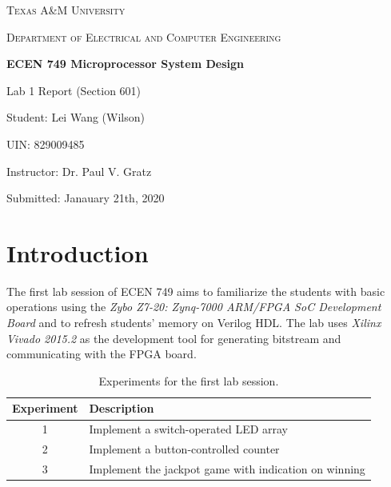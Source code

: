 \documentclass[11pt,letterpaper,titlepage]{article}
\begin{document}
\begin{titlepage}
  \centering
	{\scshape\large Texas A\&M University \par}
	\vspace{1cm}
	{\scshape\Large Department of Electrical and Computer Engineering \par}
	\vspace{4cm}
    \vspace{0.5cm}
	{\huge\bfseries ECEN 749 Microprocessor System Design\par}
	\vspace{4cm}
	{\Large Lab 1 Report (Section 601)\par}
	\vspace{1cm}
	{\Large Student: Lei Wang (Wilson)\par}
	\vspace{1cm}
	{\Large UIN: 829009485\par}
	\vspace{1cm}
	{\Large Instructor: Dr. Paul V. Gratz\par}
	\vspace{4cm}
	\vfill

	{\large Submitted: Janauary 21th, 2020 \par}

\end{titlepage}

\newpage

\tableofcontents{}

\newpage

\part{Introduction}

The first lab session of ECEN 749 aims to familiarize the students with basic operations using the \textit{Zybo Z7-20: Zynq-7000 ARM/FPGA SoC Development Board} and to refresh students' memory on Verilog HDL. The lab uses \textit{Xilinx Vivado 2015.2} as the development tool for generating bitstream and communicating with the FPGA board.

\begin{table}[ht]
\centering
\begin{tabular}{@{}cl@{}}
\toprule
Experiment & Description                                           \\ \midrule
1          & Implement a switch-operated LED array                 \\
\midrule
2          & Implement a button-controlled counter                 \\
\midrule
3          & Implement the jackpot game with indication on winning \\ \bottomrule
\end{tabular}
\caption{Experiments for the first lab session.}
\end{table}
\end{document}
